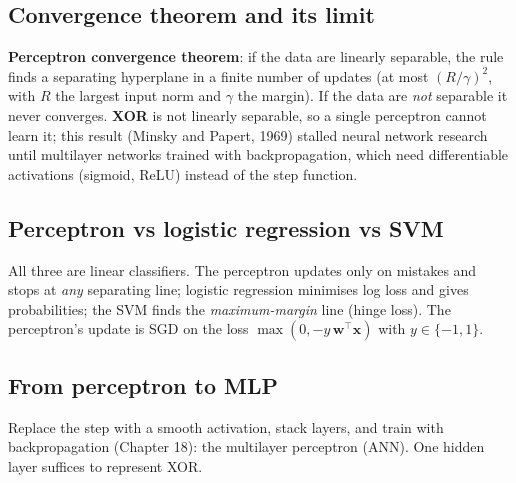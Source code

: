 \subsection{Convergence theorem and its limit}
\textbf{Perceptron convergence theorem}: if the data are linearly separable, the rule finds a separating hyperplane in a finite number of updates (at most $(R/\gamma)^2$,
with $R$ the largest input norm and $\gamma$ the margin). If the data are \emph{not} separable it never converges. \textbf{XOR} is not linearly separable, so a single
perceptron cannot learn it; this result (Minsky and Papert, 1969) stalled neural network research until multilayer networks trained with backpropagation, which
need differentiable activations (sigmoid, ReLU) instead of the step function.

\subsection{Perceptron vs logistic regression vs SVM}
All three are linear classifiers. The perceptron updates only on mistakes and stops at \emph{any} separating line; logistic regression minimises log loss and gives
probabilities; the SVM finds the \emph{maximum-margin} line (hinge loss). The perceptron's update is SGD on the loss $\max(0, -y\,\mathbf w^\top\mathbf x)$ with $y\in\{-1,1\}$.

\subsection{From perceptron to MLP}
Replace the step with a smooth activation, stack layers, and train with backpropagation (Chapter 18): the multilayer perceptron (ANN). One hidden layer suffices to
represent XOR.


